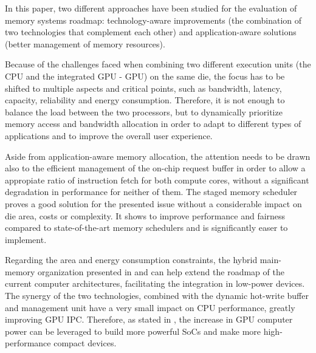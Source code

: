 \documentclass[journal]{IEEEtran}
\begin{document}
In this paper, two different approaches have been studied for the evaluation of memory systems roadmap: technology-aware improvements (the combination of two technologies that complement each other)  and application-aware solutions (better management of memory resources). 

Because of the challenges faced when combining two different execution units (the CPU and the integrated GPU - GPU) on the same die, the focus has to be shifted to multiple aspects and critical points, such as bandwidth, latency, capacity, reliability and energy consumption. Therefore, it is not enough to balance the load between the two processors, but to dynamically prioritize memory access \cite{LLC} and bandwidth allocation in order to adapt to different types of applications and to improve the overall user experience. 

Aside from application-aware memory allocation, the attention needs to be drawn also to the efficient management of the on-chip request buffer in order to allow a appropiate ratio of instruction fetch for both compute cores, without a significant degradation in performance for neither of them. The  staged memory scheduler proves a good solution for the presented issue without a considerable impact on die area, costs or complexity.  It shows to improve performance and fairness compared to state-of-the-art memory schedulers and is significantly easer to implement\cite{SmS}.

Regarding the area and energy consumption constraints, the hybrid main-memory organization presented in \cite{PRAM} and \cite{PDRAM} can help extend the roadmap of the current computer architectures, facilitating the integration in low-power devices. The synergy of the two technologies, combined with the dynamic hot-write buffer and management unit have a very small impact on CPU performance, greatly improving GPU IPC. Therefore, as stated in \cite{PRAM}, the increase in GPU computer power can be leveraged to build more powerful SoCs and make more high-performance compact devices.

\ifCLASSOPTIONcaptionsoff
  \newpage
\fi






\end{document}
